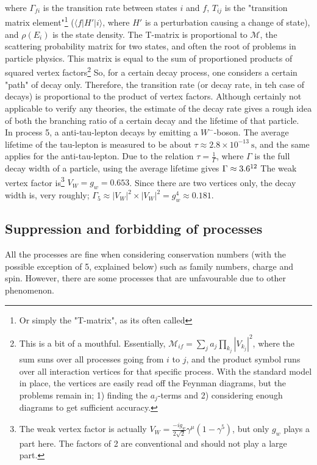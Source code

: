 \documentclass[11pt,a4paper]{article}
\begin{document}
where $\Gamma_{fi}$ is the transition rate between states $i$ and $f$, $T_{ij}$ is the "transition matrix element"\footnote{Or simply the "T-matrix", as its often called} ($\langle f|H'|i\rangle$, where $H'$ is a perturbation causing a change of state), and $\rho(E_i)$ is the state density. The T-matrix is proportional to $\mathcal{M}$, the scattering probability matrix for two states, and often the root of problems in particle physics. This matrix is equal to the sum of proportioned products of squared vertex factors\footnote{This is a bit of a mouthful. Essentially, $\mathcal{M}_{if} = \sum_j a_j\prod_{k_j}|V_{k_j}|^2$, where the sum suns over all processes going from $i$ to $j$, and the product symbol runs over all interaction vertices for that specific process. With the standard model in place, the vertices are easily read off the Feynman diagrams, but the problems remain in; 1) finding the $a_j$-terms and 2) considering enough diagrams to get sufficient accuracy.} So, for a certain decay process, one considers a certain "path" of decay only. Therefore, the transition rate (or decay rate, in teh case of decays) is proportional to the product of vertex factors. Although certainly not applicable to verify any theories, the estimate of the decay rate gives a rough idea of both the branching ratio of a certain decay and the lifetime of that particle.\\

In process 5, a anti-tau-lepton decays by emitting a $W^-$-boson. The average lifetime of the tau-lepton is measured to be about $\tau\approx2.8\times10^{-13}\:\text{s}$, and the same applies for the anti-tau-lepton. Due to the relation $\tau = \frac{1}{\Gamma}$, where $\Gamma$ is the full decay width of a particle, using the average lifetime gives $\Gamma\approx3.6\time10^{12}$ The weak vertex factor is\footnote{The weak vertex factor is actually $V_W = \frac{-ig_w}{2\sqrt{2}}\gamma^\mu(1-\gamma^5)$, but only $g_w$ plays a part here. The factors of 2 are conventional and should not play a large part.} $V_W=g_w = 0.653$. Since there are two vertices only, the decay width is, very roughly; $\Gamma_5 \approx |V_W|^2\times|V_W|^2 = g_w^4 \approx 0.181$.

%

\subsection{Suppression and forbidding of processes}
All the processes are fine when considering conservation numbers (with the possible exception of 5, explained below) such as family numbers, charge and spin. However, there are some processes that are unfavourable due to other phenomenon.
\end{document}

